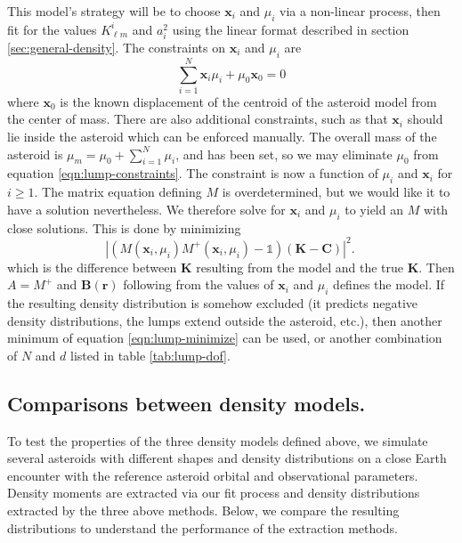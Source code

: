 \documentclass[fleqn,usenatbib]{mnras}
\begin{document}
This model's strategy will be to choose $\bm x_i$ and $\mu_i$ via a non-linear process, then fit for the values $K_{\ell m}^i$ and $a_i^2$ using the linear format described in section \ref{sec:general-density}. The constraints on $\bm x_i$ and $\mu_i$ are
\begin{equation}
  \sum_{i=1}^N \bm x_i \mu_i + \mu_0 \bm x_0 = 0
  \label{eqn:lump-constraints}
\end{equation}
where $\bm x_0$ is the known displacement of the centroid of the asteroid model from the center of mass. There are also additional constraints, such as that $\bm x_i$ should lie inside the asteroid which can be enforced manually. The overall mass of the asteroid is $\mu_m = \mu_0 + \sum_{i=1}^N \mu_i$, and has been set, so we may eliminate $\mu_0$ from equation \ref{eqn:lump-constraints}. The constraint is now a function of $\mu_i$ and $\bm x_i$ for $i \geq 1$. The matrix equation defining $M$ is overdetermined, but we would like it to have a solution nevertheless. We therefore solve for $\bm x_i$ and $\mu_i$ to yield an $M$ with close solutions. This is done by minimizing
\begin{equation}
  |(M(\bm x_i, \mu_i) M^+(\bm x_i, \mu_i) - \mathds{1}) (\bm K - \bm C)|^2.\
  \label{eqn:lump-minimize}
\end{equation}
which is the difference between $\bm K$ resulting from the model and the true $\bm K$. Then $A=M^+$ and $\bm B(\bm r)$ following from the values of $\bm x_i$ and $\mu_i$ defines the model. If the resulting density distribution is somehow excluded (it predicts negative density distributions, the lumps extend outside the asteroid, etc.), then another minimum of equation \ref{eqn:lump-minimize} can be used, or another combination of $N$ and $d$ listed in table \ref{tab:lump-dof}.




\subsection{Comparisons between density models.}
\label{sec:density-compare}

To test the properties of the three density models defined above, we simulate several asteroids with different shapes and density distributions on a close Earth encounter with the reference asteroid orbital and observational parameters. Density moments are extracted via our fit process and density distributions extracted by the three above methods. Below, we compare the resulting distributions to understand the performance of the extraction methods.
\end{document}
